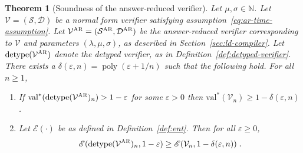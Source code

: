 \documentclass[11pt]{article}
\newtheorem{theorem}{Theorem}[section]
\theoremstyle{definition}
\newcommand{\N}{\ensuremath{\mathbb{N}}}
\DeclareMathOperator{\poly}{poly}
\newcommand{\val}{\ensuremath{\mathrm{val}}}
\newcommand{\eps}{\varepsilon}
\newcommand{\sampler}{\mathcal{S}}
\newcommand{\decider}{\mathcal{D}}
\newcommand{\verifier}{\mathcal{V}}
\newcommand{\detype}{\mathrm{detype}}
\newcommand{\gamestyle}[1]{\ensuremath{\textsc{#1}}\xspace}
\newcommand{\ar}{\gamestyle{AR}}
\newcommand{\Ent}{\mathscr{E}}
\begin{document}
\begin{theorem}[Soundness of the answer-reduced verifier]
  \label{thm:answer-red-soundness}
  Let $\mu,\sigma\in\N$.
  Let $\verifier = (\sampler,\decider)$ be a normal form verifier satisfying
  assumption~\eqref{eq:ar-time-assumption}.
  Let $\verifier^\ar = (\sampler^\ar,\decider ^\ar)$ be the answer-reduced
  verifier corresponding to $\verifier$ and parameters $(\lambda,\mu,\sigma)$,
  as described in Section~\ref{sec:ld-compiler}.
  Let $\detype(\verifier^\ar)$ denote the detyped verifier, as in
  Definition~\ref{def:detyped-verifier}.
  There exists a $\delta(\eps,n) = \poly(\eps+1/n)$ such that the following
  hold.
  For all $n\geq 1$,
  \begin{enumerate}
	\item If $\val^*(\detype(\verifier^\ar)_n) > 1 - \eps$ for some $\eps > 0$
    then $\val^*(\verifier_n) \geq 1 - \delta(\eps,n)$.\label{enu:ar-soundness}
  \item Let $\Ent(\cdot)$ be as defined in Definition~\ref{def:ent}.
    Then for all $\eps\geq 0$,
    \begin{equation*}
      \Ent(\detype(\verifier^\ar)_n, 1 - \eps) \geq
      \Ent(\verifier_{n}, 1 - \delta(\eps,n))\;.
    \end{equation*}
  \end{enumerate}
\end{theorem}
\end{document}

